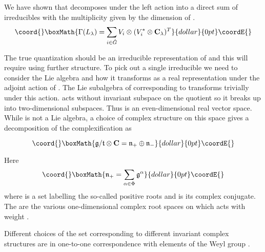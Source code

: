 \documentclass[a4paper,a4paper]{article}
\theoremstyle{conjecture}
\begin{document}
We have shown that \coordHE{} decomposes under the left \coordHE{}
action into a direct sum of irreducibles \coordHE{} with the
multiplicity given by the dimension of \coordHE{}.
$$\coord{}\boxMath{\Gamma(L_\lambda)=\sum_{i\in \hat G}V_i\otimes (V_i^*\otimes \mathbf C_\lambda)^T}{dollar}{0pt}\coordE{}$$

The true
quantization should be an irreducible representation of \coordHE{} and
this will require using further structure.
To pick out a single irreducible we need to consider the Lie
algebra \coordHE{} and how it transforms as a real
representation under the adjoint action of \coordHE{}. The Lie subalgebra
\coordHE{} of \coordHE{} corresponding to \coordHE{} transforms
trivially under this action. \coordHE{} acts without invariant subspace
on the quotient \coordHE{} so it breaks up into
two-dimensional subspaces.  Thus \coordHE{} is
an even-dimensional real vector space.  While \coordHE{} is not a Lie algebra, a choice of complex
structure on this space gives a decomposition of the
complexification as

$$\coord{}\boxMath{ {\mathfrak g}/{\mathfrak t}\otimes{\mathbf C}={\mathfrak n}_+
\oplus {\mathfrak n}_-}{dollar}{0pt}\coordE{}$$

Here
$$\coord{}\boxMath{{\mathfrak n}_+=\sum_{\alpha\in \Phi} {\mathfrak g}^\alpha}{dollar}{0pt}\coordE{}$$ where \myHighlight{$\Phi$}\coordHE{} is a set
labelling the so-called positive roots and \coordHE{} is
its complex conjugate. The \coordHE{} are the various
one-dimensional complex root spaces on which \coordHE{} acts with weight
\myHighlight{$\alpha$}\coordHE{}.

Different choices of the set \myHighlight{$\Phi$}\coordHE{} corresponding to different
invariant complex structures are in one-to-one correspondence with
elements of the Weyl group \coordHE{}.
\end{document}

